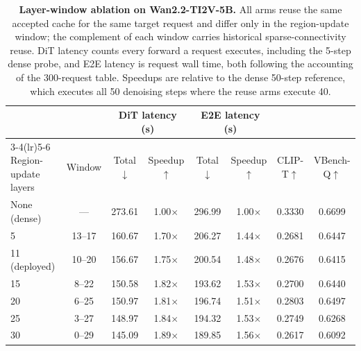 \begin{table}[t]
\centering
\small
\setlength{\tabcolsep}{4.5pt}
\caption{\textbf{Layer-window ablation on Wan2.2-TI2V-5B.} All arms reuse the same accepted cache
for the same target request and differ only in the region-update window; the complement of each
window carries historical sparse-connectivity reuse. DiT latency counts every forward a request
executes, including the 5-step dense probe, and E2E latency is request wall time, both following the
accounting of the 300-request table. Speedups are relative to the dense 50-step reference, which
executes all 50 denoising steps where the reuse arms execute 40.}
\label{tab:app-layer-window}
\begin{tabular}{l c cc cc cc}
\toprule
& & \multicolumn{2}{c}{DiT latency (s)} & \multicolumn{2}{c}{E2E latency (s)} & & \\
\cmidrule(lr){3-4}\cmidrule(lr){5-6}
Region-update layers & Window & Total$\downarrow$ & Speedup$\uparrow$ & Total$\downarrow$ & Speedup$\uparrow$ & CLIP-T$\uparrow$ & VBench-Q$\uparrow$ \\
\midrule
None (dense)      & ---      & 273.61 & 1.00$\times$ & 296.99 & 1.00$\times$ & 0.3330 & 0.6699 \\
\midrule
5                 & 13--17   & 160.67 & 1.70$\times$ & 206.27 & 1.44$\times$ & 0.2681 & 0.6447 \\
11 (deployed)     & 10--20   & 156.67 & 1.75$\times$ & 200.54 & 1.48$\times$ & 0.2676 & 0.6415 \\
15                & 8--22    & 150.58 & 1.82$\times$ & 193.62 & 1.53$\times$ & 0.2700 & 0.6440 \\
20                & 6--25    & 150.97 & 1.81$\times$ & 196.74 & 1.51$\times$ & 0.2803 & 0.6497 \\
25                & 3--27    & 148.97 & 1.84$\times$ & 194.32 & 1.53$\times$ & 0.2749 & 0.6268 \\
30                & 0--29    & 145.09 & 1.89$\times$ & 189.85 & 1.56$\times$ & 0.2617 & 0.6092 \\
\bottomrule
\end{tabular}
\end{table}

